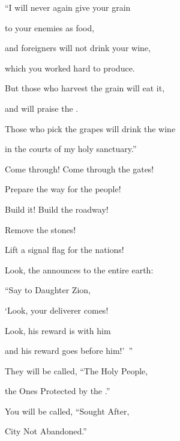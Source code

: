 {\par }{\Q “I will never
again
give
your grain
\par }{\Q to your enemies
as food,
\par }{\Q and foreigners
will not
drink
your wine,
\par }{\Q which
you worked hard to produce.
\par }{\Q {}But
those who harvest the grain
will eat
it,
\par }{\Q and will praise
the {}.
\par }{\Q Those who pick the grapes
will drink
the wine

\par }{\Q in the courts
of my holy sanctuary.”
\par }{\Q {}Come through! Come through
the gates!
\par }{\Q Prepare
the way
for the people!
\par }{\Q Build
it! Build
the roadway!
\par }{\Q Remove
the stones!
\par }{\Q Lift
a signal flag
for
the nations!
\par }{\Q {}Look,
the {}
announces
to
the entire earth:

\par }{\Q “Say
to Daughter
Zion,
\par }{\Q ‘Look,
your deliverer
comes!
\par }{\Q Look,
his reward
is with
him
\par }{\Q and his reward
goes before him!’ ”
\par }{\Q {}They will be called,
“The Holy
People,
\par }{\Q the Ones Protected
by the
{}.”
\par }{\Q You will be called,
“Sought
After,
\par }{\Q City
Not
Abandoned.”

\par }
